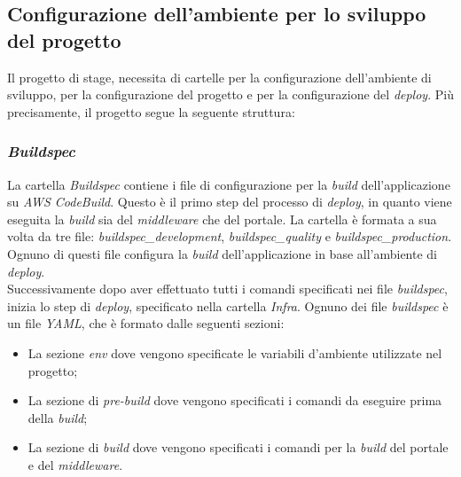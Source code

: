 \subsection{Configurazione dell'ambiente per lo sviluppo del progetto}
Il progetto di stage, necessita di cartelle per la configurazione dell'ambiente di sviluppo, per la configurazione del progetto e per la configurazione del \textit{deploy}.
Più precisamente, il progetto segue la seguente struttura:

\subsubsection*{\emph{Buildspec}}
La cartella \textit{Buildspec} contiene i file di configurazione per la \textit{build} dell'applicazione su \textit{AWS CodeBuild}.
Questo è il primo step del processo di \textit{deploy}, in quanto viene eseguita la \textit{build} sia del \textit{middleware} che del portale.
La cartella è formata a sua volta da tre file: \textit{buildspec\_development}, \textit{buildspec\_quality} e \textit{buildspec\_production}. 
Ognuno di questi file configura la \textit{build} dell'applicazione in base all'ambiente di \textit{deploy}.\\
Successivamente dopo aver effettuato tutti i comandi specificati nei file \textit{buildspec}, inizia lo step di \textit{deploy}, specificato nella cartella \textit{Infra}.
Ognuno dei file \textit{buildspec} è un file \textit{YAML}, che è formato dalle seguenti sezioni:
\begin{itemize}
  \item La sezione \textit{env} dove vengono specificate le variabili d'ambiente utilizzate nel progetto;
  \item La sezione di \textit{pre-build} dove vengono specificati i comandi da eseguire prima della \textit{build};
  \item La sezione di \textit{build} dove vengono specificati i comandi per la \textit{build} del portale e del \textit{middleware}.
\end{itemize}

